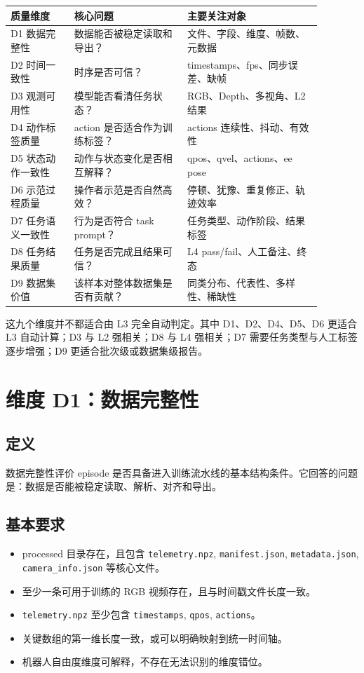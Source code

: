 \documentclass[UTF8,zihao=-4,oneside,openany]{ctexrep}
\begin{document}
\begin{longtable}{p{0.18\linewidth}p{0.32\linewidth}p{0.38\linewidth}}
\toprule
\textbf{质量维度} & \textbf{核心问题} & \textbf{主要关注对象} \\
\midrule
D1 数据完整性 & 数据能否被稳定读取和导出？ & 文件、字段、维度、帧数、元数据 \\
D2 时间一致性 & 时序是否可信？ & timestamps、fps、同步误差、缺帧 \\
D3 观测可用性 & 模型能否看清任务状态？ & RGB、Depth、多视角、L2 结果 \\
D4 动作标签质量 & action 是否适合作为训练标签？ & actions 连续性、抖动、有效性 \\
D5 状态动作一致性 & 动作与状态变化是否相互解释？ & qpos、qvel、actions、ee pose \\
D6 示范过程质量 & 操作者示范是否自然高效？ & 停顿、犹豫、重复修正、轨迹效率 \\
D7 任务语义一致性 & 行为是否符合 task prompt？ & 任务类型、动作阶段、结果标签 \\
D8 任务结果质量 & 任务是否完成且结果可信？ & L4 pass/fail、人工备注、终态 \\
D9 数据集价值 & 该样本对整体数据集是否有贡献？ & 同类分布、代表性、多样性、稀缺性 \\
\bottomrule
\end{longtable}

这九个维度并不都适合由 L3 完全自动判定。其中 D1、D2、D4、D5、D6 更适合 L3 自动计算；D3 与 L2 强相关；D8 与 L4 强相关；D7 需要任务类型与人工标签逐步增强；D9 更适合批次级或数据集级报告。

\section{维度 D1：数据完整性}

\subsection{定义}

数据完整性评价 episode 是否具备进入训练流水线的基本结构条件。它回答的问题是：数据是否能被稳定读取、解析、对齐和导出。

\subsection{基本要求}

\begin{itemize}
  \item processed 目录存在，且包含 \texttt{telemetry.npz}, \texttt{manifest.json}, \texttt{metadata.json}, \texttt{camera\_info.json} 等核心文件。
  \item 至少一条可用于训练的 RGB 视频存在，且与时间戳文件长度一致。
  \item \texttt{telemetry.npz} 至少包含 \texttt{timestamps}, \texttt{qpos}, \texttt{actions}。
  \item 关键数组的第一维长度一致，或可以明确映射到统一时间轴。
  \item 机器人自由度维度可解释，不存在无法识别的维度错位。
\end{itemize}
\end{document}
